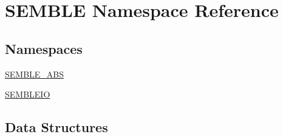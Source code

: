 \hypertarget{namespaceSEMBLE}{}\section{S\+E\+M\+B\+LE Namespace Reference}
\label{namespaceSEMBLE}
\subsection*{Namespaces}
\begin{DoxyCompactItemize}
\item 
 \mbox{\hyperlink{namespaceSEMBLE_1_1SEMBLE__ABS}{S\+E\+M\+B\+L\+E\+\_\+\+A\+BS}}
\item 
 \mbox{\hyperlink{namespaceSEMBLE_1_1SEMBLEIO}{S\+E\+M\+B\+L\+E\+IO}}
\end{DoxyCompactItemize}
\subsection*{Data Structures}
